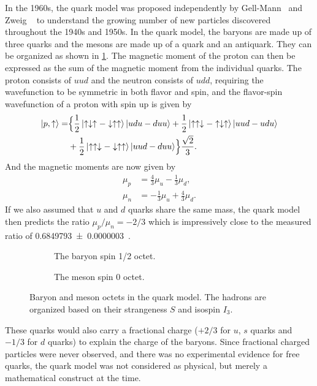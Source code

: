 \documentclass[../main.tex]{subfiles}
\begin{document}
In the 1960s, the quark model was proposed independently by Gell-Mann~\cite{gell-mann1964} and Zweig ~\cite{zweig1964a, zweig1964}
to understand the growing number of new particles discovered throughout the 1940s and 1950s.
In the quark model, the baryons are made up of three quarks and the mesons are made up
of a quark and an antiquark. They can be organized as shown in \cref{fig:Octet}.
The magnetic moment of the proton can then be expressed as the sum of the magnetic moment
from the individual quarks. The proton consists of $uud$ and the neutron consists of $udd$,
requiring the wavefunction to be symmetric in both flavor and spin, and the flavor-spin wavefunction of a proton with
spin up is given by
\begin{equation}
	\begin{split}
		\ket{p,\uparrow}= & \Bigl\{\frac{1}{2}\ket{\uparrow\downarrow\uparrow-\downarrow\uparrow\uparrow}\ket{udu-duu} + \frac{1}{2}\ket{\uparrow\uparrow\downarrow-\uparrow\downarrow\uparrow}\ket{uud-udu} \\
		                  & +\frac{1}{2}\ket{\uparrow\uparrow\downarrow-\downarrow\uparrow\uparrow}\ket{uud-duu}\Bigr\} \frac{\sqrt{2}}{3}.
	\end{split}
\end{equation}
And the magnetic moments are now given by
\begin{align}
	\mu_p & = \frac{4}{3}\mu_u-\frac{1}{3}\mu_d,  \\
	\mu_n & = -\frac{1}{3}\mu_u+\frac{4}{3}\mu_d.
\end{align}
If we also assumed that $u$ and $d$ quarks share the same mass, the quark model
then predicts the ratio $\mu_p/\mu_n=-2/3$ which is impressively close to the measured ratio of
\num{0.6849793(3)}~\cite{workman2022}.
\begin{figure}[h!]
	\centering
	\begin{subfigure}{0.45\linewidth}
		
		\caption{The baryon spin 1/2 octet.}
	\end{subfigure}
	\hspace{3mm}%
	\begin{subfigure}{0.45\linewidth}
		
		\caption{The meson spin 0 octet.}
	\end{subfigure}
	\caption{Baryon and meson octets in the quark model.
		The hadrons are organized based on their strangeness $S$ and isospin $I_3$.}
	\label{fig:Octet}
\end{figure}
These quarks would also carry a fractional charge ($+2/3$ for $u$, $s$ quarks and $-1/3$ for $d$ quarks) to
explain the charge of the baryons. Since fractional charged particles were never observed, and there was
no experimental evidence for free quarks, the quark model was not considered as physical, but merely a mathematical construct at the time.
\end{document}
